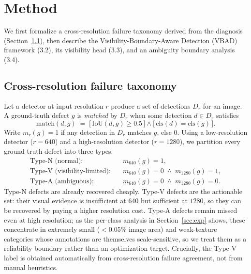\section{Method}
\label{sec:method}

We first formalize a cross-resolution failure taxonomy derived from the
diagnosis (Section~\ref{sec:taxonomy}), then describe the Visibility-Boundary-Aware
Detection (VBAD) framework (3.2), its visibility head (3.3), and an ambiguity
boundary analysis (3.4).

\subsection{Cross-resolution failure taxonomy}
\label{sec:taxonomy}
Let a detector at input resolution $r$ produce a set of detections $D_r$ for an
image. A ground-truth defect $g$ is \emph{matched} by $D_r$ when some
detection $d \in D_r$ satisfies
\begin{equation}
\mathrm{match}(d, g) \;=\; \big[\,\mathrm{IoU}(d, g) \ge 0.5\,\big] \wedge
\big[\,\mathrm{cls}(d) = \mathrm{cls}(g)\,\big].
\end{equation}
Write $m_r(g) = 1$ if any detection in $D_r$ matches $g$, else $0$. Using a
low-resolution detector ($r{=}640$) and a high-resolution detector
($r{=}1280$), we partition every ground-truth defect into three types:
\begin{align}
\text{Type-N (normal)}:&\quad m_{640}(g) = 1,\\
\text{Type-V (visibility-limited)}:&\quad m_{640}(g) = 0 \;\wedge\; m_{1280}(g) = 1,\\
\text{Type-A (ambiguous)}:&\quad m_{640}(g) = 0 \;\wedge\; m_{1280}(g) = 0.
\end{align}
Type-N defects are already recovered cheaply. Type-V defects are the actionable
set: their visual evidence is insufficient at $640$ but sufficient at $1280$,
so they can be recovered by paying a higher resolution cost. Type-A defects
remain missed even at high resolution; as the per-class analysis in
Section~\ref{sec:exp} shows, these concentrate in extremely small
($<0.05\%$ image area) and weak-texture categories whose annotations are
themselves scale-sensitive, so we treat them as a reliability boundary rather
than an optimization target. Crucially, the Type-V label is obtained
automatically from cross-resolution failure agreement, not from manual
heuristics.

